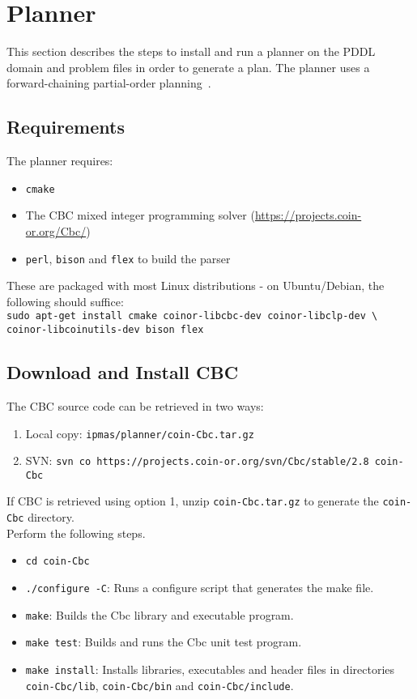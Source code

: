 \section{Planner}\label{section:planner}
This section describes the steps to install and run a planner on the PDDL domain and problem files in order to generate a plan. The planner uses a forward-chaining partial-order planning~\cite{Coles.ICAPS.2010}.

\subsection{Requirements}
The planner requires:
\begin{itemize}
\item \texttt{cmake}
\item The CBC mixed integer programming solver (\url{https://projects.coin-or.org/Cbc/})
\item \texttt{perl}, \texttt{bison} and \texttt{flex} to build the parser
\end{itemize}

These are packaged with most Linux distributions - on Ubuntu/Debian, the following should suffice:\\

\texttt{sudo apt-get install cmake coinor-libcbc-dev coinor-libclp-dev \textbackslash \\coinor-libcoinutils-dev bison flex}

\subsection{Download and Install CBC}
The CBC source code can be retrieved in two ways:

\begin{enumerate}
\item Local copy: \texttt{ipmas/planner/coin-Cbc.tar.gz}
\item SVN: \footnotesize{\texttt{svn co https://projects.coin-or.org/svn/Cbc/stable/2.8 coin-Cbc}}
\end{enumerate}

If CBC is retrieved using option 1, unzip \texttt{coin-Cbc.tar.gz} to generate the \texttt{coin-Cbc} directory.\\ 

Perform the following steps.
\begin{itemize}
\item \texttt{cd coin-Cbc}
\item \texttt{./configure -C}: Runs a configure script that generates the make file.
\item \texttt{make}: Builds the Cbc library and executable program.
\item \texttt{make test}: Builds and runs the Cbc unit test program.
\item \texttt{make install}: Installs libraries, executables and header files in directories \texttt{coin-Cbc/lib}, \texttt{coin-Cbc/bin} and \texttt{coin-Cbc/include}.
\end{itemize}

